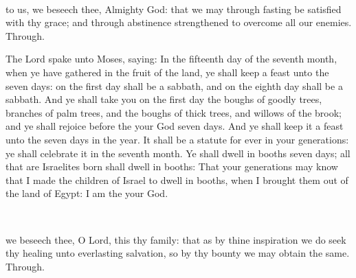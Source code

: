 \\


\collect
{} to us, we beseech thee, Almighty God: that we may through fasting be satisfied with thy grace; and through abstinence strengthened to overcome all our enemies. Through.

 The Lord spake unto Moses, saying: In the fifteenth day of the seventh month, when ye have gathered in the fruit of the land, ye shall keep a feast unto the  seven days: on the first day shall be a sabbath, and on the eighth day shall be a sabbath. And ye shall take you on the first day the boughs of goodly trees, branches of palm trees, and the boughs of thick trees, and willows of the brook; and ye shall rejoice before the  your God seven days. And ye shall keep it a feast unto the  seven days in the year. It shall be a statute for ever in your generations: ye shall celebrate it in the seventh month. Ye shall dwell in booths seven days; all that are Israelites born shall dwell in booths: That your generations may know that I made the children of Israel to dwell in booths, when I brought them out of the land of Egypt: I am the  your God.

\\


\collect
{} we beseech thee, O Lord, this thy family: that as by thine inspiration we do seek thy healing unto everlasting salvation, so by thy bounty we may obtain the same. Through.

